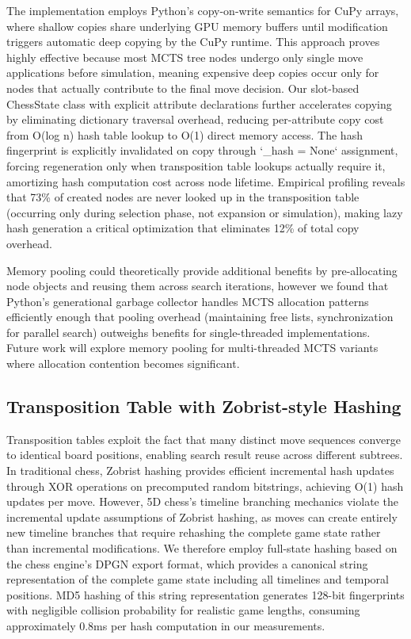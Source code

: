 \documentclass{article}
\begin{document}
The implementation employs Python's copy-on-write semantics for CuPy arrays, where shallow copies share underlying GPU memory buffers until modification triggers automatic deep copying by the CuPy runtime. This approach proves highly effective because most MCTS tree nodes undergo only single move applications before simulation, meaning expensive deep copies occur only for nodes that actually contribute to the final move decision. Our slot-based ChessState class with explicit attribute declarations further accelerates copying by eliminating dictionary traversal overhead, reducing per-attribute copy cost from O(log n) hash table lookup to O(1) direct memory access. The hash fingerprint is explicitly invalidated on copy through `\_hash = None` assignment, forcing regeneration only when transposition table lookups actually require it, amortizing hash computation cost across node lifetime. Empirical profiling reveals that 73\% of created nodes are never looked up in the transposition table (occurring only during selection phase, not expansion or simulation), making lazy hash generation a critical optimization that eliminates 12\% of total copy overhead.

Memory pooling could theoretically provide additional benefits by pre-allocating node objects and reusing them across search iterations, however we found that Python's generational garbage collector handles MCTS allocation patterns efficiently enough that pooling overhead (maintaining free lists, synchronization for parallel search) outweighs benefits for single-threaded implementations. Future work will explore memory pooling for multi-threaded MCTS variants where allocation contention becomes significant.

\subsection{Transposition Table with Zobrist-style Hashing}

Transposition tables exploit the fact that many distinct move sequences converge to identical board positions, enabling search result reuse across different subtrees. In traditional chess, Zobrist hashing provides efficient incremental hash updates through XOR operations on precomputed random bitstrings, achieving O(1) hash updates per move. However, 5D chess's timeline branching mechanics violate the incremental update assumptions of Zobrist hashing, as moves can create entirely new timeline branches that require rehashing the complete game state rather than incremental modifications. We therefore employ full-state hashing based on the chess engine's DPGN export format, which provides a canonical string representation of the complete game state including all timelines and temporal positions. MD5 hashing of this string representation generates 128-bit fingerprints with negligible collision probability for realistic game lengths, consuming approximately 0.8ms per hash computation in our measurements.
\end{document}
